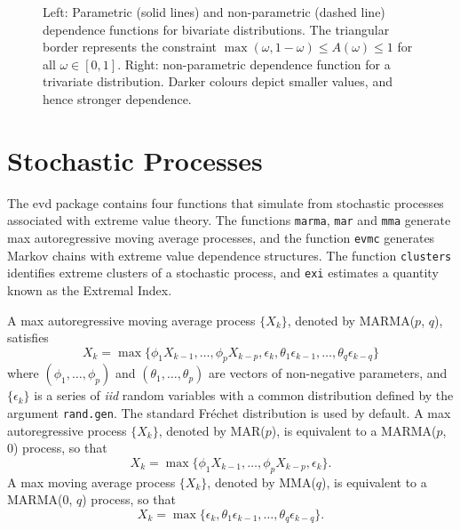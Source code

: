 \documentclass[11pt,a4paper]{article}
\begin{document}
\begin{figure}
\hspace*{2.5cm}
\hspace{0cm} 
\vspace{-1cm}
\caption{Left: Parametric (solid lines) and non-parametric (dashed line) dependence functions for bivariate distributions. The triangular border represents the constraint $\max(\omega,1-\omega) \leq A(\omega) \leq 1$ for all $\omega \in [0,1]$. Right: non-parametric dependence function for a trivariate distribution. Darker colours depict smaller values, and hence stronger dependence.}
\label{depfns}
\end{figure}


\section{Stochastic Processes}
\setcounter{footnote}{0}
\label{stochproc}

The evd package contains four functions that simulate from stochastic processes associated with extreme value theory.
The functions \verb+marma+, \verb+mar+ and \verb+mma+ generate max autoregressive moving average processes, and the function \verb+evmc+ generates Markov chains with extreme value dependence structures.
The function \verb+clusters+ identifies extreme clusters of a stochastic process, and \verb+exi+ estimates a quantity known as the Extremal Index.

A max autoregressive moving average process $\{X_k\}$, denoted by MARMA($p$, $q$), satisfies
\begin{equation*}
X_k = \max\{\phi_1 X_{k-1}, \dots, \phi_p X_{k-p}, \epsilon_k, \theta_1 \epsilon_{k-1}, \dots, \theta_q \epsilon_{k-q}\}
\end{equation*}
where $(\phi_1, \dots, \phi_p)$ and $(\theta_1, \ldots, \theta_p)$ are vectors of non-negative parameters, and $\{\epsilon_k\}$ is a series of \emph{iid} random variables with a common distribution defined by the argument \verb+rand.gen+. The standard Fr\'{e}chet distribution is used by default.
A max autoregressive process $\{X_k\}$, denoted by MAR($p$), is equivalent to a MARMA($p$, 0) process, so that
\begin{equation*}
X_k = \max\{\phi_1 X_{k-1}, \dots, \phi_p X_{k-p}, \epsilon_k\}.
\end{equation*}
A max moving average process $\{X_k\}$, denoted by MMA($q$), is equivalent to a MARMA(0, $q$) process, so that
\begin{equation*}
X_k = \max\{\epsilon_k, \theta_1 \epsilon_{k-1}, \dots, \theta_q \epsilon_{k-q}\}.
\end{equation*}
\end{document}
